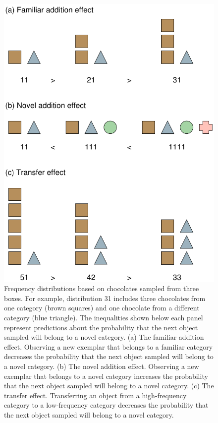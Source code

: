 \documentclass[doc]{apa6}
\begin{document}
\begin{figure}
\begin{center}
\includegraphics[scale=0.7]{introfig2-eps-converted-to.pdf}
\caption{Frequency distributions based on chocolates sampled from three boxes. For example, distribution 31 includes three chocolates from one category (brown squares) and one chocolate from a different category (blue triangle). The inequalities shown below each panel represent predictions about the probability that the next object sampled will belong to a novel category.
(a) The familiar addition effect. Observing a new exemplar that belongs to a familiar category decreases the probability that the next object sampled will belong to a novel category. (b) The novel addition effect. Observing a new exemplar that belongs to a novel category increases the probability that the next object sampled will belong to a novel category. (c) The transfer effect. Transferring an object from a high-frequency category to a low-frequency category decreases the probability that the next object sampled will belong to a novel category.}
\label{fig:intro}
\end{center}
\end{figure}
\end{document}
